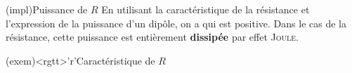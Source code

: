 \documentclass[../../main/main.tex]{subfiles}
\begin{document}
\begin{tcbraster}[raster columns=2, raster equal height=rows]
	\begin{tcb*}[label=impl:resistance](impl){Puissance de $R$}
		En utilisant la caractéristique de la résistance et l'expression de la
		puissance d'un dipôle, on a
		\psw{%
			\[
				\boxed{P_{\text{reçue}} = RI^2 = \frac{U^2}{R} = GU^2}
			\]
		}%
		qui est positive. Dans le cas de la résistance, cette puissance est
		entièrement \textbf{dissipée} par effet \textsc{Joule}.
	\end{tcb*}
	\begin{tcb}[label=exem:resistance](exem)<rgtt>'r'{Caractéristique de $R$}
		\begin{center}
		\end{center}
	\end{tcb}
\end{tcbraster}
\end{document}
